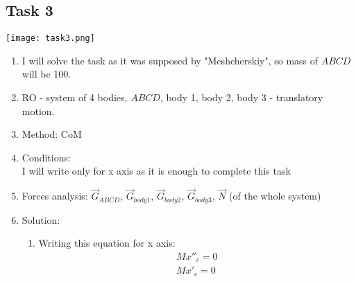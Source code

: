 \subsection*{Task 3}

\texttt{[image: task3.png]}

\begin{enumerate}
    \item I will solve the task as it was supposed by "Meshcherskiy", so mass of $ABCD$ will be 100.
    \item RO - system of 4 bodies, $ABCD$, body 1, body 2, body 3 - translatory motion.
    \item Method: CoM
    \item Conditions: \\
          I will write only for x axis as it is enough to complete this task \\
    \item Forces analysis: $\vec{G}_{ABCD}$,
          $\vec{G}_{body1}$,
          $\vec{G}_{body2}$,
          $\vec{G}_{body3}$,
          $\vec{N}$ (of the whole system)
    \item Solution:
          \begin{enumerate}
              \item Writing this equation for x axis:
                    \begin{align}
                        M x''_c = 0 \\
                        M x'_c = 0  \\

\end{align}
\end{enumerate}
\end{enumerate}
